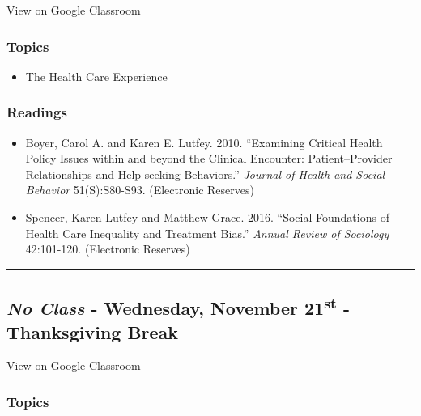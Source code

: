 \documentclass[]{book}
\providecommand{\tightlist}{%
  \setlength{\itemsep}{0pt}\setlength{\parskip}{0pt}}
\theoremstyle{definition}
\theoremstyle{definition}
\theoremstyle{definition}
\theoremstyle{remark}
\begin{document}
View on Google Classroom

\hypertarget{topics-24}{%
\subsubsection*{Topics}\label{topics-24}}

\begin{itemize}
\tightlist
\item
  The Health Care Experience
\end{itemize}

\hypertarget{readings-22}{%
\subsubsection*{Readings}\label{readings-22}}

\begin{itemize}
\tightlist
\item
  Boyer, Carol A. and Karen E. Lutfey. 2010. ``Examining Critical Health
  Policy Issues within and beyond the Clinical Encounter:
  Patient--Provider Relationships and Help-seeking Behaviors.''
  \emph{Journal of Health and Social Behavior} 51(S):S80-S93.
  (Electronic Reserves)
\item
  Spencer, Karen Lutfey and Matthew Grace. 2016. ``Social Foundations of
  Health Care Inequality and Treatment Bias.'' \emph{Annual Review of
  Sociology} 42:101-120. (Electronic Reserves)
\end{itemize}

\begin{center}\rule{0.5\linewidth}{\linethickness}\end{center}

\hypertarget{no-class---wednesday-november-21st---thanksgiving-break}{%
\subsection*{\texorpdfstring{\emph{No Class} - Wednesday, November
21\textsuperscript{st} - Thanksgiving
Break}{No Class - Wednesday, November 21st - Thanksgiving Break}}\label{no-class---wednesday-november-21st---thanksgiving-break}}

View on Google Classroom

\hypertarget{topics-25}{%
\subsubsection*{Topics}\label{topics-25}}
\end{document}
